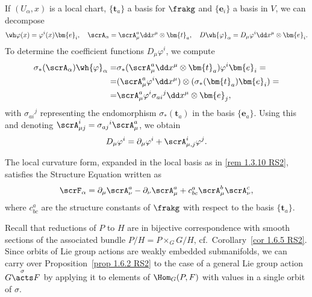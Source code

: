 \begin{rem}\label{rem 1.4.14 RS2}
    If $(U_\alpha,x)$ is a local chart, $\{\bm{t}_a\}$ a basis for $\frakg$ and $\{\bm{e}_i\}$ a basis in $V$, we can decompose
    \[\wh\varphi(x)=\varphi^i(x)\bm{e}_i,\quad \scrA_\alpha=\scrA_\mu^a\dd x^\mu\otimes \bm{t}_a,\quad D\wh{\varphi}_\alpha=D_\mu \varphi^i\dd x^\mu\otimes \bm{e}_i.\]
    To determine the coefficient functions $D_\mu\varphi^i$, we compute
    \begin{align}
        \sigma_\ast(\scrA_\alpha)\wh{\varphi}_\alpha=&\sigma_\ast(\scrA_\mu^a\dd x^\mu\otimes\bm{t}_a)\varphi^i\bm{e}_i=\\
        =&(\scrA_\mu^a\varphi^i\dd x^\mu)\otimes(\sigma_\ast(\bm{t}_a)\bm{e}_i)=\\
        =&\scrA_\mu^a\varphi^i\sigma_{ai}{}^j\dd x^\mu\otimes \bm{e}_j,
    \end{align}
    with $\sigma_{ai}{}^j$ representing the endomorphism $\sigma_\ast(\bm{t}_a)$ in the basis $\{\bm{e}_a\}$. Using this and denoting $\scrA_{\mu j}^i=\sigma_{aj}{}^i\scrA_\mu^a$, we obtain 
    \[D_\mu\varphi^i=\partial_\mu\varphi^i+\scrA_{\mu,j}^i \varphi^j.\]
\end{rem}

\begin{rem}
    The local curvature form, expanded in the local basis as in \ref{rem 1.3.10 RS2}, satisfies the Structure Equation written as
    \[\scrF_\alpha=\partial_\mu \scrA_\nu^a-\partial_\nu\scrA_\mu^a+c^a_{bc}\scrA_\mu^b\scrA_\nu^c,\]
    where $c^a_{bc}$ are the structure constants of $\frakg$ with respect to the basis $\{\bm{t}_a\}$.
\end{rem}

Recall that reductions of $P$ to $H$ are in bijective correspondence with smooth sections of the associated bundle $P\slash H=P\times_G G\slash H$, cf.\ Corollary~\ref{cor 1.6.5 RS2}. Since orbits of Lie group actions are weakly embedded submanifolds, we can carry over Proposition~\ref{prop 1.6.2 RS2} to the case of a general Lie group action $G\overset{\sigma}{\acts}F$ by applying it to elements of $\Hom_G(P,F)$ with values in a single orbit of $\sigma$.

